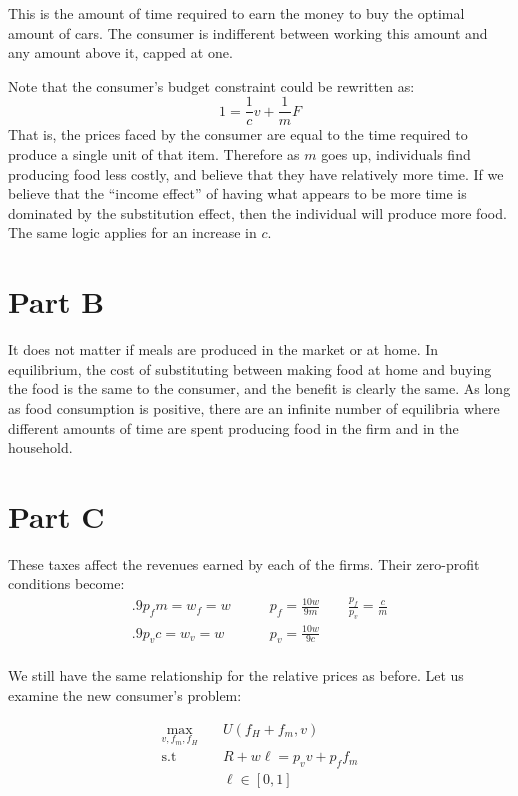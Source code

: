 \documentclass[12pt]{paper}
\begin{document}
This is the amount of time required to earn the money to buy the
optimal amount of cars. The consumer is indifferent between working
this amount and any amount above it, capped at one.

Note that the consumer's budget constraint could be rewritten as:
\begin{equation*}
  1 = \frac{1}{c} v + \frac{1}{m}F
\end{equation*}
That is, the prices faced by the consumer are equal to the time
required to produce a single unit of that item. Therefore as $m$ goes
up, individuals find producing food less costly, and believe that they
have relatively more time. If we believe that the ``income effect'' of
having what appears to be more time is dominated by the substitution
effect, then the individual will produce more food. The same logic
applies for an increase in $c$.

\section*{Part B}
It does not matter if meals are produced in the market or at home. In
equilibrium, the cost of substituting between making food at home and
buying the food is the same to the consumer, and the benefit is
clearly the same. As long as food consumption is positive, there
are an infinite number of equilibria where different amounts of time
are spent producing food in the firm and in the household.

\section*{Part C}

These taxes affect the revenues earned by each of the firms. Their
zero-profit conditions become: 
\begin{align*}
  .9 p_f m  = w_f = w \quad \quad & p_f = \frac{10 w}{9 m} \quad \quad   \frac{p_f}{p_v} = \frac{c}{m}
 \\
  .9 p_v c  = w_v = w \quad \quad &p_v = \frac{10 w}{9 c}\\
\end{align*}

We still have the same relationship for the relative prices as
before. Let us examine the new consumer's problem:

\begin{align*}
  \max_{v,f_m,f_H} \quad&U( f_H + f_m, v)\\
  \text{s.t} \quad& R + w\ell = p_v v + p_f f_m\\
  & \ell \in [0,1]
\end{align*}
\end{document}
